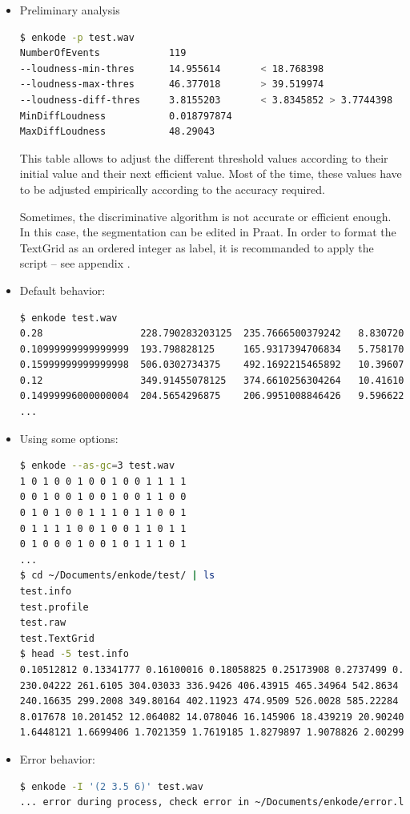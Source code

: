 \begin{itemize}
\item Preliminary analysis
\begin{lstlisting}[language=bash]
$ enkode -p test.wav 
NumberOfEvents            119
--loudness-min-thres      14.955614       < 18.768398
--loudness-max-thres      46.377018       > 39.519974
--loudness-diff-thres     3.8155203       < 3.8345852 > 3.7744398
MinDiffLoudness           0.018797874
MaxDiffLoudness           48.29043
\end{lstlisting}
This table allows to adjust the different threshold values according to their initial value and their next efficient value.
Most of the time, these values have to be adjusted empirically according to the accuracy required.

\smallskip

Sometimes, the discriminative algorithm is not accurate or efficient enough. In this case, the segmentation can be edited in Praat. In order to format the TextGrid as an ordered integer as label, it is recommanded to apply the script  -- see appendix .

\item Default behavior:
\begin{lstlisting}[language=bash]
$ enkode test.wav 
0.28                 228.790283203125  235.7666500379242   8.830720512009613    1.7966619273740976  
0.10999999999999999  193.798828125     165.9317394706834   5.758170441172713    1.9914783596510206  
0.15999999999999998  506.0302734375    492.1692215465892   10.396071452511483   1.6476902981421457  
0.12                 349.91455078125   374.6610256304264   10.416102008324566   1.6657044245205024  
0.14999996000000004  204.5654296875    206.9951008846426   9.59662211074838     1.9097877289745604     
...
\end{lstlisting}
\item Using some options:
\begin{lstlisting}[language=bash]
$ enkode --as-gc=3 test.wav
1 0 1 0 0 1 0 0 1 0 0 1 1 1 1  
0 0 1 0 0 1 0 0 1 0 0 1 1 0 0  
0 1 0 1 0 0 1 1 1 0 1 1 0 0 1  
0 1 1 1 1 0 0 1 0 0 1 1 0 1 1  
0 1 0 0 0 1 0 0 1 0 1 1 1 0 1   
...  
$ cd ~/Documents/enkode/test/ | ls
test.info
test.profile
test.raw	
test.TextGrid
$ head -5 test.info
0.10512812 0.13341777 0.16100016 0.18058825 0.25173908 0.2737499 0.3035293  
230.04222 261.6105 304.03033 336.9426 406.43915 465.34964 542.8634  
240.16635 299.2008 349.80164 402.11923 474.9509 526.0028 585.22284  
8.017678 10.201452 12.064082 14.078046 16.145906 18.439219 20.902403  
1.6448121 1.6699406 1.7021359 1.7619185 1.8279897 1.9078826 2.0029936   
\end{lstlisting}
\item Error behavior:
\begin{lstlisting}[language=bash]
$ enkode -I '(2 3.5 6)' test.wav
... error during process, check error in ~/Documents/enkode/error.log ...
\end{lstlisting}
\end{itemize}

